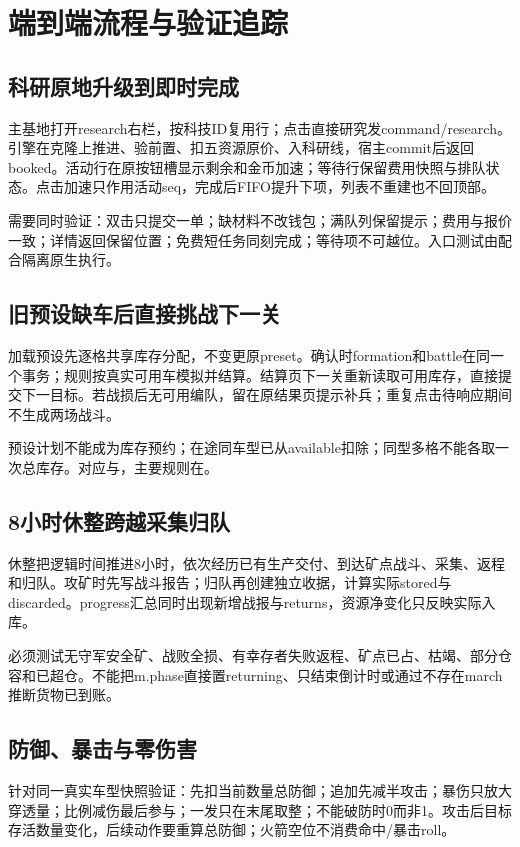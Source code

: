 \chapter{端到端流程与验证追踪}
\section{科研原地升级到即时完成}
主基地打开research右栏，按科技ID复用行；点击直接研究发command/research。引擎在克隆上推进、验前置、扣五资源原价、入科研线，宿主commit后返回booked。活动行在原按钮槽显示剩余和金币加速；等待行保留费用快照与排队状态。点击加速只作用活动seq，完成后FIFO提升下项，列表不重建也不回顶部。

需要同时验证：双击只提交一单；缺材料不改钱包；满队列保留提示；费用与报价一致；详情返回保留位置；免费短任务同刻完成；等待项不可越位。入口测试由配合隔离原生执行。

\section{旧预设缺车后直接挑战下一关}
加载预设先逐格共享库存分配，不变更原preset。确认时formation和battle在同一个事务；规则按真实可用车模拟并结算。结算页下一关重新读取可用库存，直接提交下一目标。若战损后无可用编队，留在原结果页提示补兵；重复点击待响应期间不生成两场战斗。

预设计划不能成为库存预约；在途同车型已从available扣除；同型多格不能各取一次总库存。对应与，主要规则在。

\section{8小时休整跨越采集归队}
休整把逻辑时间推进8小时，依次经历已有生产交付、到达矿点战斗、采集、返程和归队。攻矿时先写战斗报告；归队再创建独立收据，计算实际stored与discarded。progress汇总同时出现新增战报与returns，资源净变化只反映实际入库。

必须测试无守军安全矿、战败全损、有幸存者失败返程、矿点已占、枯竭、部分仓容和已超仓。不能把m.phase直接置returning、只结束倒计时或通过不存在march推断货物已到账。

\section{防御、暴击与零伤害}
针对同一真实车型快照验证：先扣当前数量总防御；追加先减半攻击；暴伤只放大穿透量；比例减伤最后参与；一发只在末尾取整；不能破防时0而非1。攻击后目标存活数量变化，后续动作要重算总防御；火箭空位不消费命中/暴击roll。

